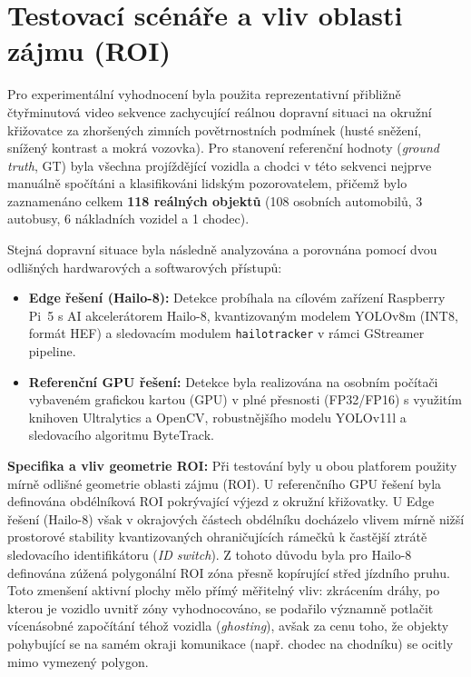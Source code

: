 \documentclass[male,czech,api_bc]{kitheses}
\begin{document}

\section{Testovací scénáře a vliv oblasti zájmu (ROI)}
Pro experimentální vyhodnocení byla použita reprezentativní přibližně čtyřminutová video sekvence zachycující reálnou dopravní situaci na okružní křižovatce za zhoršených zimních povětrnostních podmínek (husté sněžení, snížený kontrast a mokrá vozovka). Pro stanovení referenční hodnoty (\textit{ground truth}, GT) byla všechna projíždějící vozidla a chodci v této sekvenci nejprve manuálně spočítáni a klasifikováni lidským pozorovatelem, přičemž bylo zaznamenáno celkem \textbf{118 reálných objektů} (108 osobních automobilů, 3 autobusy, 6 nákladních vozidel a 1 chodec).

Stejná dopravní situace byla následně analyzována a porovnána pomocí dvou odlišných hardwarových a softwarových přístupů:
\begin{itemize}
    \item \textbf{Edge řešení (Hailo-8):} Detekce probíhala na cílovém zařízení Raspberry Pi~5 s AI akcelerátorem Hailo-8, kvantizovaným modelem YOLOv8m (INT8, formát HEF) a sledovacím modulem \texttt{hailotracker} v rámci GStreamer pipeline.
    \item \textbf{Referenční GPU řešení:} Detekce byla realizována na osobním počítači vybaveném grafickou kartou (GPU) v plné přesnosti (FP32/FP16) s využitím knihoven Ultralytics a OpenCV, robustnějšího modelu YOLOv11l a sledovacího algoritmu ByteTrack.
\end{itemize}

\textbf{Specifika a vliv geometrie ROI:}
Při testování byly u obou platforem použity mírně odlišné geometrie oblasti zájmu (ROI). U referenčního GPU řešení byla definována obdélníková ROI pokrývající výjezd z okružní křižovatky. U Edge řešení (Hailo-8) však v okrajových částech obdélníku docházelo vlivem mírně nižší prostorové stability kvantizovaných ohraničujících rámečků k častější ztrátě sledovacího identifikátoru (\textit{ID switch}). Z tohoto důvodu byla pro Hailo-8 definována zúžená polygonální ROI zóna přesně kopírující střed jízdního pruhu. Toto zmenšení aktivní plochy mělo přímý měřitelný vliv: zkrácením dráhy, po kterou je vozidlo uvnitř zóny vyhodnocováno, se podařilo významně potlačit vícenásobné započítání téhož vozidla (\textit{ghosting}), avšak za cenu toho, že objekty pohybující se na samém okraji komunikace (např. chodec na chodníku) se ocitly mimo vymezený polygon.
\end{document}
